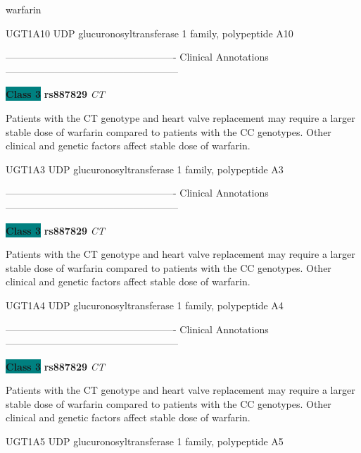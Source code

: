 \documentclass{resume} %
\begin{document}
\begin{rSection}{ warfarin }
\begin{rSubsection}{ UGT1A10 }{ UDP glucuronosyltransferase 1 family, polypeptide A10 }{}{}
\item[] ---------------------------------------------------- Clinical Annotations -----------------------------------------------------\newline
\item \textbf{\colorbox{teal} {Class 3}} \textbf{ rs887829 } \textit{ CT }
\item[] Patients with the CT genotype and heart valve replacement may require a larger stable dose of warfarin compared to patients with the CC genotypes. Other clinical and genetic factors affect stable dose of warfarin.
\end{rSubsection}\begin{rSubsection}{ UGT1A3 }{ UDP glucuronosyltransferase 1 family, polypeptide A3 }{}{}
\item[]

\item[] ---------------------------------------------------- Clinical Annotations -----------------------------------------------------\newline
\item \textbf{\colorbox{teal} {Class 3}} \textbf{ rs887829 } \textit{ CT }
\item[] Patients with the CT genotype and heart valve replacement may require a larger stable dose of warfarin compared to patients with the CC genotypes. Other clinical and genetic factors affect stable dose of warfarin.
\end{rSubsection}\begin{rSubsection}{ UGT1A4 }{ UDP glucuronosyltransferase 1 family, polypeptide A4 }{}{}
\item[]

\item[] ---------------------------------------------------- Clinical Annotations -----------------------------------------------------\newline
\item \textbf{\colorbox{teal} {Class 3}} \textbf{ rs887829 } \textit{ CT }
\item[] Patients with the CT genotype and heart valve replacement may require a larger stable dose of warfarin compared to patients with the CC genotypes. Other clinical and genetic factors affect stable dose of warfarin.
\end{rSubsection}\begin{rSubsection}{ UGT1A5 }{ UDP glucuronosyltransferase 1 family, polypeptide A5 }{}{}
\item[]


\end{rSubsection}
\end{rSection}
\end{document}
